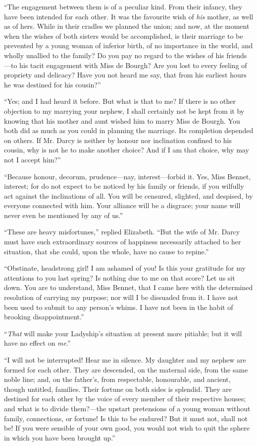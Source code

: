\documentclass[12pt]{book}
\begin{document}
``The engagement between them is of a peculiar kind. From their infancy, they have been intended for each other. It was the favourite wish of \textit{his} mother, as well as of hers. While in their cradles we planned the union; and now, at the moment when the wishes of both sisters would be accomplished, is their marriage to be prevented by a young woman of inferior birth, of no importance in the world, and wholly unallied to the family? Do you pay no regard to the wishes of his friends---to his tacit engagement with Miss de Bourgh? Are you lost to every feeling of propriety and delicacy? Have you not heard me say, that from his earliest hours he was destined for his cousin?''

``Yes; and I had heard it before. But what is that to me? If there is no other objection to my marrying your nephew, I shall certainly not be kept from it by knowing that his mother and aunt wished him to marry Miss de Bourgh. You both did as much as you could in planning the marriage. Its completion depended on others. If Mr. Darcy is neither by honour nor inclination confined to his cousin, why is not he to make another choice? And if I am that choice, why may not I accept him?''

``Because honour, decorum, prudence---nay, interest---forbid it. Yes, Miss Bennet, interest; for do not expect to be noticed by his family or friends, if you wilfully act against the inclinations of all. You will be censured, slighted, and despised, by everyone connected with him. Your alliance will be a disgrace; your name will never even be mentioned by any of us.''

``These are heavy misfortunes,'' replied Elizabeth. ``But the wife of Mr. Darcy must have such extraordinary sources of happiness necessarily attached to her situation, that she could, upon the whole, have no cause to repine.''

``Obstinate, headstrong girl! I am ashamed of you! Is this your gratitude for my attentions to you last spring? Is nothing due to me on that score? Let us sit down. You are to understand, Miss Bennet, that I came here with the determined resolution of carrying my purpose; nor will I be dissuaded from it. I have not been used to submit to any person's whims. I have not been in the habit of brooking disappointment.''

``\textit{That} will make your Ladyship's situation at present more pitiable; but it will have no effect on \textit{me}.''

``I will not be interrupted! Hear me in silence. My daughter and my nephew are formed for each other. They are descended, on the maternal side, from the same noble line; and, on the father's, from respectable, honourable, and ancient, though untitled, families. Their fortune on both sides is splendid. They are destined for each other by the voice of every member of their respective houses; and what is to divide them?---the upstart pretensions of a young woman without family, connections, or fortune! Is this to be endured? But it must not, shall not be! If you were sensible of your own good, you would not wish to quit the sphere in which you have been brought up.''
\end{document}
